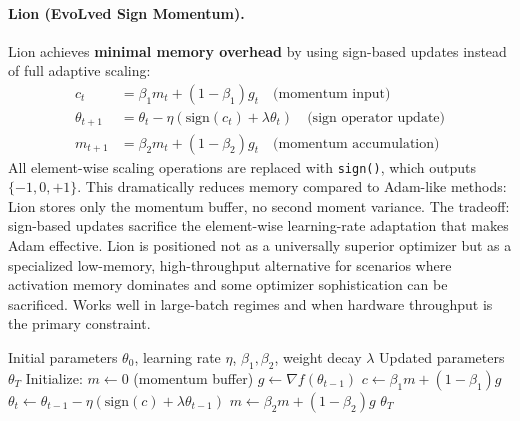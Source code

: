 \paragraph{Lion (EvoLved Sign Momentum).}
Lion achieves \textbf{minimal memory overhead} by using sign-based updates instead of full adaptive scaling:\begin{align}
c_t &= \beta_1 m_t + (1-\beta_1) g_t \quad\text{(momentum input)} \\
\theta_{t+1} &= \theta_t - \eta \left(\text{sign}(c_t) + \lambda\theta_t\right) \quad\text{(sign operator update)} \\
m_{t+1} &= \beta_2 m_t + (1-\beta_2) g_t \quad\text{(momentum accumulation)}
\end{align}
All element-wise scaling operations are replaced with \texttt{sign()}, which outputs $\{-1, 0, +1\}$. This dramatically reduces memory compared to Adam-like methods: Lion stores only the momentum buffer, no second moment variance. The tradeoff: sign-based updates sacrifice the element-wise learning-rate adaptation that makes Adam effective. Lion is positioned not as a universally superior optimizer but as a specialized low-memory, high-throughput alternative for scenarios where activation memory dominates and some optimizer sophistication can be sacrificed. Works well in large-batch regimes and when hardware throughput is the primary constraint.

\begin{algorithm}[H]
\caption{Lion (EvoLved Sign Momentum)}
\label{alg:lion}
\begin{algorithmic}[1]
\Require Initial parameters $\theta_0$, learning rate $\eta$, $\beta_1, \beta_2$, weight decay $\lambda$
\Ensure Updated parameters $\theta_T$
\State Initialize: $m \gets 0$ (momentum buffer)
    \State $g \gets \nabla f(\theta_{t-1})$ 
    \State $c \gets \beta_1 m + (1-\beta_1) g$ 
    \State $\theta_t \gets \theta_{t-1} - \eta (\text{sign}(c) + \lambda \theta_{t-1})$ 
    \State $m \gets \beta_2 m + (1-\beta_2) g$ 
\EndFor
\Return $\theta_T$
\end{algorithmic}
\end{algorithm}

